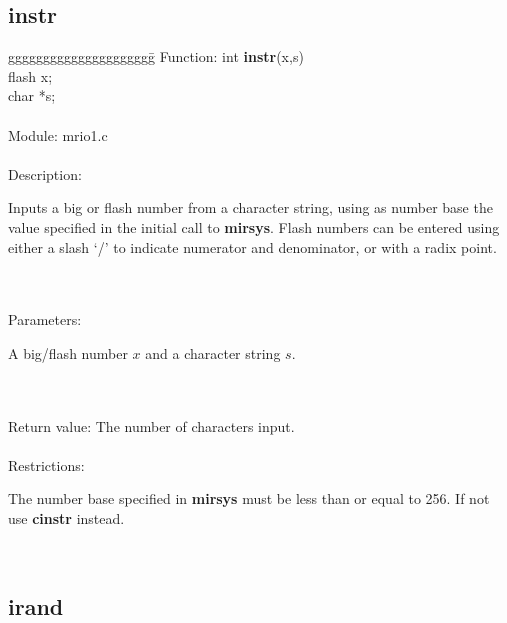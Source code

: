 \subsection {instr}
\begin{tabbing}
ggggggggggggggggggggg\= \kill
      Function:      \>int {\bf instr}(x,s) \\
                     \>flash x; \\
                     \>char *s; \\
      \ \\
      Module:        \>mrio1.c \\
      \ \\
      Description:   \>
                     \parbox[t]{3 in}
                     {Inputs a big or flash number from a character string,
                     using as number base the value specified in the initial
                     call to {\bf mirsys}.
                     Flash numbers can be entered using either
                     a slash `/' to indicate numerator and denominator, or
                     with a radix point.} \\
      \ \\
      Parameters:    \>
                     \parbox[t]{3 in}
                     {A big/flash number $x$ and a character string $s$.} \\
      \ \\
      Return value:  \>The number of characters input. \\
      \ \\
      Restrictions:  \>
                     \parbox[t]{3in}
                     {The number base specified in {\bf mirsys} must be less
                     than or equal to 256. If not use {\bf cinstr} instead.} \\
\end{tabbing}
       

\subsection{irand}

